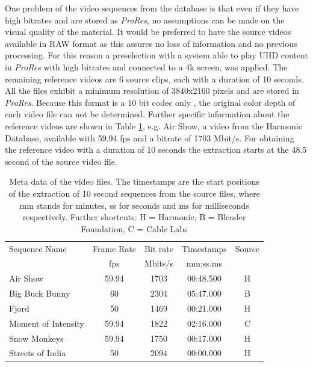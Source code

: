 One problem of the video sequences from the database is that even if they have high bitrates and are stored as \textit{ProRes}, no assumptions can be made on the visual quality of the material. It would be preferred to have the source videos available in RAW format as this assures no loss of information and no previous processing.
For this reason a preselection with a system able to play UHD content in \textit{ProRes} with high bitrates and connected to a 4k screen, was applied.
The remaining reference videos are 6 source clips, each with a duration of 10 seconds. All the files exhibit a minimum resolution of 3840x2160 pixels and are stored in \textit{ProRes}. Because this format is a 10 bit codec only \cite{web:ProRes}, the original color depth of each video file can not be determined.
Further specific information about the reference videos are shown in Table \ref{tab:Specifications}, e.g. Air Show, a video from the Harmonic Database, available with 59.94 fps and a bitrate of 1703 Mbit/s. For obtaining the reference video with a duration of 10 seconds the extraction starts at the 48.5 second of the source video file.

\begin{table}[hbt!]
	\renewcommand{\arraystretch}{1.3}
	\centering
	\caption{Meta data of the video files. The timestamps are the start positions of the extraction of 10 second sequences from the source files, where mm stands for minutes, ss for seconds and ms for milliseconds respectively. Further shortcuts: H = Harmonic, B = Blender Foundation, C = Cable Labs}
	\label{tab:Specifications}
	\begin{tabular}{lcccc}
		\toprule
		Sequence Name       & Frame Rate & Bit rate & Timestamps & Source\\
		& fps  	   & Mbits/s    & mm:ss.ms   & \\
		\midrule
		Air Show            & 59.94    & 1703 & 00:48.500  &   H  \\
		Big Buck Bunny      & 60       & 2304 & 05:47.000  &   B  \\
		Fjord               & 50       & 1469 & 00:21.000  &   H  \\
		Moment of Intensity & 59.94    & 1822 & 02:16.000  &   C \\
		Snow Monkeys        & 59.94    & 1750 & 00:17.000  &   H  \\
		Streets of India    & 50       & 2094 & 00:00.000  &   H  \\
		\bottomrule
	\end{tabular}
\end{table}

